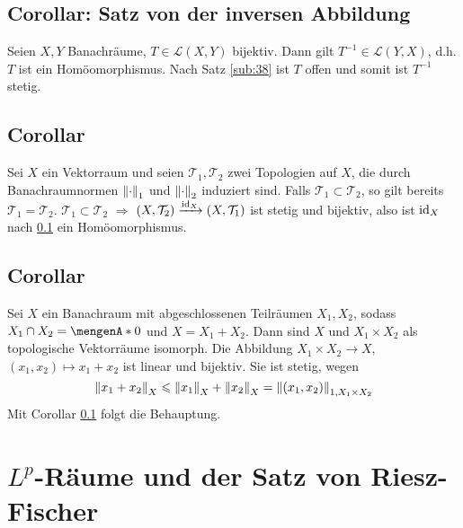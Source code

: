 \subsection{Corollar: Satz von der inversen Abbildung} %
\label{sub:39}
Seien $X,Y$ Banachräume, $T \in \mathcal{L}(X,Y)$ bijektiv. Dann gilt $T ^{-1} \in \mathcal{L}(Y,X)$, d.h. $T$ ist ein Homöomorphismus.
Nach Satz \ref{sub:38} ist $T$ offen und somit ist $T ^{-1}$ stetig. \bewende

\subsection{Corollar} %
\label{sub:310}
Sei $X$ ein Vektorraum und seien $\mathcal{T}_1, \mathcal{T}_2$ zwei Topologien auf $X$, die durch Banachraumnormen $\norm[1]{\cdot }$ und $\norm[2]{\cdot}$ induziert sind.
Falls $\mathcal{T}_1 \subset \mathcal{T}_2$, so gilt bereits $\mathcal{T}_1 = \mathcal{T}_2$.
$\mathcal{T}_1 \subset \mathcal{T}_2$ $\Rightarrow $ $(X,\mathcal{T}_2) \xrightarrow{\operatorname{id}_X} (X,\mathcal{T}_1)$ ist stetig und bijektiv, also ist $\operatorname{id}_X$ nach 
\ref{sub:39} ein Homöomorphismus. \bewende

\subsection{Corollar} %
\label{sub:311}
Sei $X$ ein Banachraum mit abgeschlossenen Teilräumen $X_1,X_2$, sodass $X_1 \cap X_2 = \set{0}$ und $X= X_1 + X_2$. Dann sind $X$ und $X_1 \times X_2$ als topologische
Vektorräume isomorph.
Die Abbildung $X_1 \times X_2 \to X$, $(x_1,x_2) \mapsto x_1 + x_2$ ist linear und bijektiv. Sie ist stetig, wegen 
\[
	\norm[X]{x_1 + x_2} \le \norm[X]{x_1} + \norm[X]{x_2} = \norm[1,X_1 \times X_2]{(x_1,x_2)} 
\]
Mit Corollar \ref{sub:39} folgt die Behauptung. \bewende
\newpage

\section{$L^p$-Räume und der Satz von Riesz-Fischer} %
\label{sec:4}

